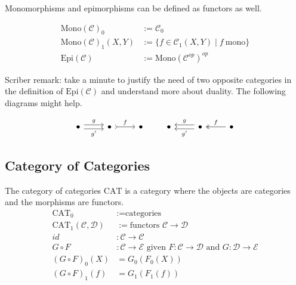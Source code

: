 \documentclass[12pt]{article}
\theoremstyle{plain}
\theoremstyle{definition}
\theoremstyle{remark}
\newcommand{\cat}[1]{\mathcal{#1}}
\begin{document}
Monomorphisms and epimorphisms can be defined as functors as well.

\begin{align*}
  \mathrm{Mono}(\cat{C})_0 &:= \cat{C}_0 \\
  \mathrm{Mono}(\cat{C})_1(X, Y) &:= \{ f \in \cat{C}_1(X, Y) \mid f~\text{mono} \} \\
  \mathrm{Epi}(\cat{C}) &:= \mathrm{Mono}(\cat{C}^{op})^{op}
\end{align*}

Scriber remark: take a minute to justify the need of two opposite categories in the definition of $\mathrm{Epi}(\cat{C})$ and understand more about duality. The following diagrams might help.

\[\begin{tikzcd}
	\bullet & \bullet & \bullet
	\arrow["{g'}"', shift right, from=1-1, to=1-2]
	\arrow["g", shift left, from=1-1, to=1-2]
	\arrow["f", tail, from=1-2, to=1-3]
\end{tikzcd} \qquad \begin{tikzcd}
	\bullet & \bullet & \bullet
	\arrow["{g'}", shift left, from=1-2, to=1-1]
	\arrow["g"', shift right, from=1-2, to=1-1]
	\arrow["f"', two heads, from=1-3, to=1-2]
\end{tikzcd}\]


\subsection{Category of Categories}

The category of categories $\mathrm{CAT}$ is a category where the objects are categories and the morphisms are functors.
\begin{align*}
  \mathrm{CAT}_0 &:= \text{categories} \\
  \mathrm{CAT}_1(\cat{C}, \cat{D}) &:= \text{functors } \cat{C} \to \cat{D} \\
  id &: \cat{C} \to \cat{C} \\
  G \circ F &: \cat{C} \to \cat{E} \text{ given } F: \cat{C} \to \cat{D} \text{ and } G: \cat{D} \to \cat{E} \\
  (G \circ F)_0(X) &= G_0(F_0(X)) \\
  (G \circ F)_1(f) &= G_1(F_1(f)) \\
\end{align*}
\end{document}
